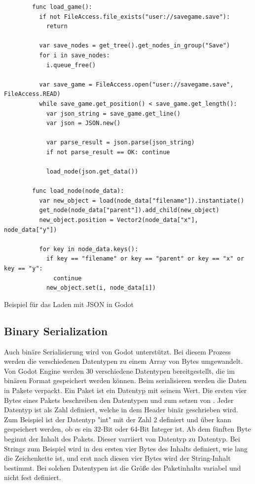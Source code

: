 \begin{listing}[htp]
    \begin{verbatim}
        func load_game():
          if not FileAccess.file_exists("user://savegame.save"):
            return

          var save_nodes = get_tree().get_nodes_in_group("Save")
          for i in save_nodes:
            i.queue_free()

          var save_game = FileAccess.open("user://savegame.save", FileAccess.READ)
          while save_game.get_position() < save_game.get_length():
            var json_string = save_game.get_line()
            var json = JSON.new()

            var parse_result = json.parse(json_string)
            if not parse_result == OK: continue

            load_node(json.get_data())

        func load_node(node_data):
          var new_object = load(node_data["filename"]).instantiate()
          get_node(node_data["parent"]).add_child(new_object)
          new_object.position = Vector2(node_data["x"], node_data["y"])

          for key in node_data.keys():
            if key == "filename" or key == "parent" or key == "x" or key == "y":
              continue
            new_object.set(i, node_data[i])
    \end{verbatim}
    \caption{Beispiel für das Laden mit JSON in Godot\cite{godotengineSavingGames}}
    \label{lst:godotJsonLoad}
\end{listing} 

\subsection{Binary Serialization}
Auch binäre Serialisierung wird von Godot unterstützt. Bei diesem Prozess werden die verschiedenen Datentypen zu einem Array von Bytes umgewandelt. Von Godot Engine werden 30 verschiedene Datentypen bereitgestellt, die im binären Format gespeichert werden können. Beim serialisieren werden die Daten in Pakete verpackt. Ein Paket ist ein Datentyp mit seinem Wert. Die ersten vier Bytes eines Pakets beschreiben den Datentypen und zum setzen von . Jeder Datentyp ist als Zahl definiert, welche in dem Header binär geschrieben wird. Zum Beispiel ist der Datentyp "int" mit der Zahl 2 definiert und über  kann gespeichert werden, ob es ein 32-Bit oder 64-Bit Integer ist. Ab dem fünften Byte beginnt der Inhalt des Pakets. Dieser varriiert von Datentyp zu Datentyp. Bei Strings zum Beispiel wird in den ersten vier Bytes des Inhalts definiert, wie lang die Zeichenkette ist, und erst nach diesen vier Bytes wird der String-Inhalt bestimmt. Bei solchen Datentypen ist die Größe des Paketinhalts variabel und nicht fest definiert.\cite{godotengineBinarySerialization}

